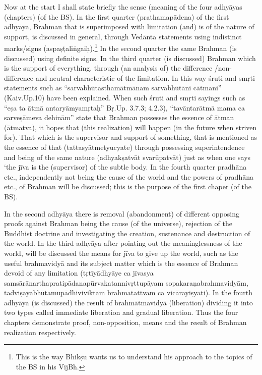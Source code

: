 

Now at the start I shall state briefly the sense (meaning of the four adhyāyas (chapters) (of the BS). In the first quarter (prathamapādena) of the first adhyāya, Brahman that is superimposed with limitation (and) is of the nature of support, is discussed in general, through Vedānta statements using indistinct marks/signs (aspaṣṭaliṅgaiḥ).\footnote{This is the way Bhikṣu wants us to understand his approach to the topics of the BS in his VijBh.} In the second  quarter the same Brahman (is discussed) using definite signs. In the third quarter (is discussed) Brahman which is the support of everything. through (an analysis of) the difference /non-difference and neutral characteristic of the limitation.  In this way śruti and smṛti statements such as “sarvabhūtasthamātmānam sarvabhūtāni cātmani” (Kaiv.Up.10) have been explained. When such śruti and smṛti sayings such as “eṣa ta ātmā antaryāmyamṛtaḥ” Bṛ.Up. 3.7.3; 4.2.3), “tavāntarātmā mama ca sarveṣāmeva dehinām” state that Brahman possesses the essence of ātman (ātmatva), it hopes that (this realization) will happen (in the future when striven for). That which is the supervisor and support of something, that is mentioned as the essence of that (tattasyātmetyucyate) through possessing superintendence and being of the same nature (adhyakṣatvāt svarūpatvāt) just as when one says ‘the jīva is the (supervisor) of the subtle body. In the fourth quarter pradhāna etc., independently not being the cause of the world and the powers of pradhāna etc., of Brahman will be discussed; this is the purpose of the first chaper (of the BS).  

In the second adhyāya there is removal (abandonment) of different opposing proofs against Brahman being the cause (of the universe), rejection of the Buddhist doctrine and investigating the creation, sustenance and destruction of the world. In the third adhyāya after pointing out the meaninglessness of the world, will be discussed the means for jīva to give up the world, such as the useful brahmavidyā and its subject matter which is the essence of Brahman devoid of any limitation (tṛtīyādhyāye ca jīvasya samsārānarthapratipādanapūrvakatannivṛttupāyam sopakaraṇabrahmavidyām, tadviṣayabhūtamupādhivi\-viktam brahmatattvam ca vicārayiṣyati). In the fourth adhyāya (is discussed) the result of brahmātmavidyā (liberation) dividing it into two types called immediate liberation and gradual liberation. Thus the four chapters demonstrate proof, non-opposition, means and the result of Brahman realization respectively.

